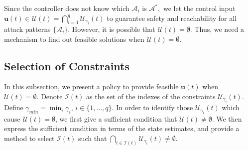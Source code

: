 \documentclass[journal]{IEEEtran}
\newtheorem{Theorem}{Theorem}
\begin{document}
Since the controller does not know which $\mathcal{A}_i$ is $\mathcal{A}^{\ast},$ we let the control input $\mathbf{u}(t) \in \mathcal{U}(t) = \bigcap_{i = 1}^{q} \mathcal{U}_{\gamma_i}(t)$ to guarantee safety and reachability for all attack patterns $\{\mathcal{A}_i\}.$ However, it is possible that $\mathcal{U}(t) = \emptyset.$ Thus, we need a mechanism to find out feasible solutions when $\mathcal{U}(t) = \emptyset.$


\subsection{Selection of Constraints}
In this subsection, we present a policy to provide feasible $\mathbf{u}(t)$ when $\mathcal{U}(t) = \emptyset.$ Denote $\mathcal{I}(t)$ as the set of the indexes of the constraints $\mathcal{U}_{\gamma_i}(t).$ Define $\gamma_{min} = \min_{i} \gamma_i$, $i \in \{1,\ldots,q\}$. %
In order to identify those $\mathcal{U}_{\gamma_i}(t)$ which cause $\mathcal{U}(t) = \emptyset$, we first give a sufficient condition that $\mathcal{U}(t) \neq \emptyset$. We then express the sufficient condition in terms of the state estimates, and provide a method to select $\mathcal{I}(t)$ such that $\bigcap_{i \in \mathcal{I}(t)}{\mathcal{U}_{\gamma_{i}}(t)} \neq \emptyset$.
\end{document}
